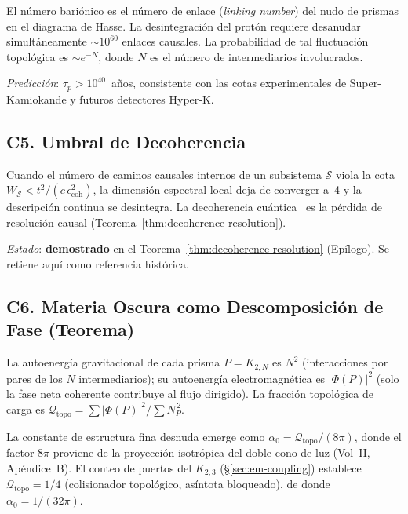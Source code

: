 \documentclass[11pt, a4paper, openany]{book}
\begin{document}
El n\'umero bari\'onico es el n\'umero de enlace (\textit{linking number})
del nudo de prismas en el diagrama de Hasse. La desintegraci\'on del
prot\'on requiere desanudar simult\'aneamente $\sim\!10^{60}$ enlaces
causales. La probabilidad de tal fluctuaci\'on topol\'ogica es
$\sim e^{-N}$, donde $N$ es el n\'umero de intermediarios
involucrados.

\medskip\noindent
\textit{Predicci\'on}: $\tau_p > 10^{40}$~a\~nos, consistente con
las cotas experimentales de Super-Kamiokande y futuros detectores
Hyper-K.

\subsection*{C5. Umbral de Decoherencia}
\label{conj:decoherence-threshold}

Cuando el n\'umero de caminos causales internos de un subsistema
$\mathcal{S}$ viola la cota $W_{\mathcal{S}} < t^2 /
(c\,\epsilon_{\text{coh}}^2)$, la dimensi\'on espectral local
deja de converger a~4 y la descripci\'on continua se desintegra.
La decoherencia cu\'antica~\cite{zurek2003} es la p\'erdida de
resoluci\'on causal (Teorema~\ref{thm:decoherence-resolution}).

\medskip\noindent
\textit{Estado}: \textbf{demostrado} en el Teorema~\ref{thm:decoherence-resolution} (Ep\'ilogo).
Se retiene aqu\'i como referencia hist\'orica.

\subsection*{C6. Materia Oscura como Descomposici\'on de Fase (Teorema)}
\label{conj:dark-matter}

La autoenerg\'ia gravitacional de cada prisma $P = K_{2,N}$ es
$N^2$ (interacciones por pares de los $N$ intermediarios); su
autoenerg\'ia electromagn\'etica es $|\Phi(P)|^2$ (solo la fase
neta coherente contribuye al flujo dirigido). La fracci\'on
topol\'ogica de carga es
$\mathcal{Q}_{\mathrm{topo}} = \sum|\Phi(P)|^2 / \sum N_P^{\,2}$.

La constante de estructura fina desnuda emerge como
$\alpha_0 = \mathcal{Q}_{\mathrm{topo}} / (8\pi)$, donde el factor
$8\pi$ proviene de la proyecci\'on isotr\'opica del doble cono de luz
(Vol~II, Ap\'endice~B). El conteo de puertos del $K_{2,3}$
(\S\ref{sec:em-coupling}) establece
$\mathcal{Q}_{\mathrm{topo}} = 1/4$ (colisionador topol\'ogico,
as\'intota bloqueado), de donde $\alpha_0 = 1/(32\pi)$.
\end{document}

